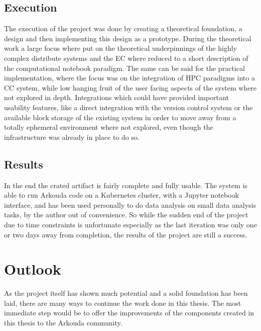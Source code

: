 \subsection{Execution}

The execution of the project was done by creating a theoretical foundation, a design and then implementing this design as a prototype.
During the theoretical work a large focus where put on the theoretical underpinnings of the highly complex
distribute systems and the \ac{EC} where reduced to a short description of the computational notebook paradigm.
The same can be said for the practical implementation, where the focus was on the integration of \ac{HPC} paradigms into a \ac{CC} system,
while low hanging fruit of the user facing aspects of the system where not explored in depth.
Integrations which could have provided important usability features, like a direct integration with the version control system or
the available block storage of the existing system in order to move away from a totally ephemeral environment where not explored,
even though the infrastructure was already in place to do so.

\subsection{Results}

In the end the crated artifact is fairly complete and fully usable.
The system is able to run Arkouda code on a Kubernetes cluster, with a Jupyter notebook interface,
and has been used personally to do data analysis on small data analysis tasks, by the author out
of convenience.
So while the sudden end of the project due to time constraints is unfortunate especially
as the last iteration was only one or two days away from completion, the results of the project are still a success.


\section{Outlook}

As the project itself has shown much potential and a solid foundation has been laid,
there are many ways to continue the work done in this thesis.
The most immediate step would be to offer the improvements of the components
created in this thesis to the Arkouda community.


